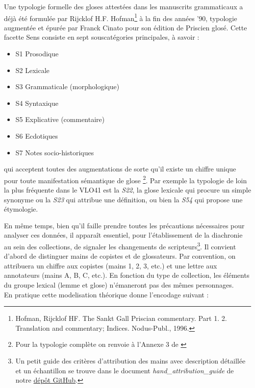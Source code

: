 \documentclass[a4paper, twoside, 12pt]{book}
\begin{document}
Une typologie formelle des gloses attestées dans les manuscrits grammaticaux a déjà été formulée par Rijcklof H.F. Hofman\footnote{Hofman, Rijcklof HF. The Sankt Gall Priscian commentary. Part 1. 2. Translation and commentary; Indices. Nodus-Publ., 1996.} à la fin des années '90, typologie augmentée et épurée par Franck Cinato pour son édition de Priscien glosé. Cette facette \og{} Sens \fg{} consiste en sept souscatégories principales, à savoir :

\begin{itemize}
    \item S1 Prosodique
    \item S2 Lexicale
    \item S3 Grammaticale (morphologique)
    \item S4 Syntaxique
    \item S5 Explicative (commentaire)
    \item S6 Ecdotiques
    \item S7 Notes socio-historiques
\end{itemize}
 qui acceptent toutes des augmentations de sorte qu'il existe un chiffre unique pour toute manifestation sémantique de glose \footnote{Pour la typologie complète on renvoie à l'Annexe 3 de \cite{cinato2015priscien}}. Par exemple la typologie de loin la plus fréquente dans le VLO41 est la \textit{S22}, la glose lexicale qui procure un simple synonyme ou la \textit{S23} qui attribue une définition, ou bien la \textit{S54} qui propose une étymologie.
 
En même temps, bien qu’il faille prendre toutes les précautions nécessaires pour analyser ces données, il apparaît essentiel, pour l’établissement de la diachronie au sein des collections, de signaler les changements de scripteurs\footnote{Un petit guide des critères d'attribution des mains avec description détaillée et un échantillon se trouve dans le document \textit{hand\_attribution\_guide} de notre \href{https://github.com/malamatenia/Eutyches/blob/main/hand_attribution_guide.pdf}{dépôt GitHub}.}. Il convient d’abord de distinguer mains de copistes et de glossateurs. Par convention, on attribuera un chiffre aux copistes (mains 1, 2, 3, etc.) et une lettre aux annotateurs (mains A, B, C, etc.). En fonction du type de collection, les éléments du groupe lexical (lemme et glose) n’émaneront pas des mêmes personnages. \\

En pratique cette modelisation théorique donne l'encodage suivant : 
\end{document}
